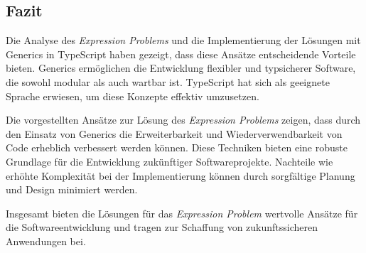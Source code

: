 \documentclass{easychair}
\begin{document}
  \subsection{Fazit}

  Die Analyse des \textit{Expression Problems} und die Implementierung der Lösungen mit Generics in TypeScript haben gezeigt, dass diese Ansätze entscheidende Vorteile bieten. Generics ermöglichen die Entwicklung flexibler und typsicherer Software, die sowohl modular als auch wartbar ist. TypeScript hat sich als geeignete Sprache erwiesen, um diese Konzepte effektiv umzusetzen.
  
  Die vorgestellten Ansätze zur Lösung des \textit{Expression Problems} zeigen, dass durch den Einsatz von Generics die Erweiterbarkeit und Wiederverwendbarkeit von Code erheblich verbessert werden können. Diese Techniken bieten eine robuste Grundlage für die Entwicklung zukünftiger Softwareprojekte. Nachteile wie erhöhte Komplexität bei der Implementierung können durch sorgfältige Planung und Design minimiert werden.
  
  Insgesamt bieten die Lösungen für das \textit{Expression Problem} wertvolle Ansätze für die Softwareentwicklung und tragen zur Schaffung von zukunftssicheren Anwendungen bei.
  
 \newpage
\label{sect:bib}

%
%
%

\end{document}
